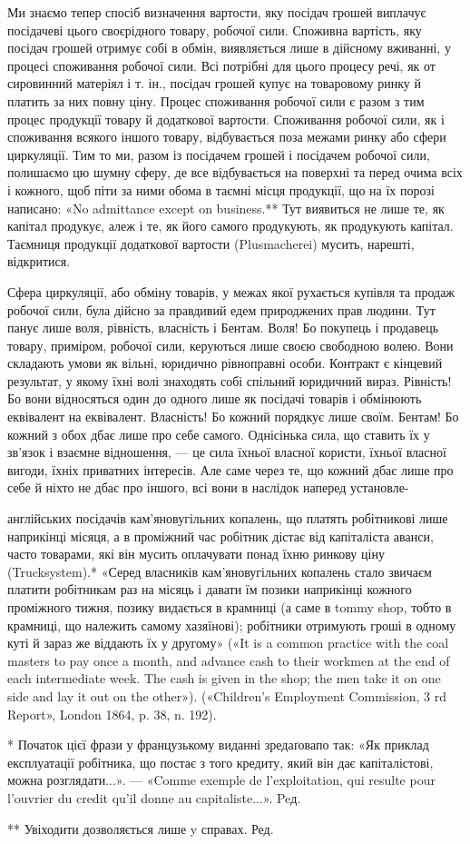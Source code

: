 Ми знаємо тепер спосіб визначення вартости, яку посідач
грошей виплачує посідачеві цього своєрідного товару, робочої
сили. Споживна вартість, яку посідач грошей отримує собі в
обмін, виявляється лише в дійсному вживанні, у процесі споживання
робочої сили. Всі потрібні для цього процесу речі, як от
сировинний матеріял і т. ін., посідач грошей купує на товаровому
ринку й платить за них повну ціну. Процес споживання
робочої сили є разом з тим процес продукції товару й додаткової
вартости. Споживання робочої сили, як і споживання всякого
іншого товару, відбувається поза межами ринку або сфери циркуляції.
Тим то ми, разом із посідачем грошей і посідачем робочої
сили, полишаємо цю шумну сферу, де все відбувається на поверхні
та перед очима всіх і кожного, щоб піти за ними обома в таємні
місця продукції, що на їх порозі написано: «No admittance except
on business.** Тут виявиться не лише те, як капітал продукує,
алеж і те, як його самого продукують, як продукують капітал.
Таємниця продукції додаткової вартости (Plusmacherei) мусить,
нарешті, відкритися.

Сфера циркуляції, або обміну товарів, у межах якої рухається
купівля та продаж робочої сили, була дійсно за правдивий
едем природжених прав людини. Тут панує лише воля, рівність,
власність і Бентам. Воля! Бо покупець і продавець товару, приміром,
робочої сили, керуються лише своєю свободною волею.
Вони складають умови як вільні, юридично рівноправні особи.
Контракт є кінцевий результат, у якому їхні волі знаходять собі
спільний юридичний вираз. Рівність! Бо вони відносяться один
до одного лише як посідачі товарів і обмінюють еквівалент на
еквівалент. Власність! Бо кожний порядкує лише своїм. Бентам!
Бо кожний з обох дбає лише про себе самого. Однісінька
сила, що ставить їх у зв’язок і взаємне відношення, — це сила
їхньої власної користи, їхньої власної вигоди, їхніх приватних
інтересів. Але саме через те, що кожний дбає лише про себе й
ніхто не дбає про іншого, всі вони в наслідок наперед установле-

англійських посідачів кам’яновугільних копалень, що платять робітникові
лише наприкінці місяця, а в проміжний час робітник дістає від капіталіста
аванси, часто товарами, які він мусить оплачувати понад їхню
ринкову ціну (Trucksystem).* «Серед власників кам’яновугільних копалень
стало звичаєм платити робітникам раз на місяць і давати їм позики
наприкінці кожного проміжного тижня, позику видається в крамниці
(а саме в tommy shop, тобто в крамниці, що належить самому хазяїнові);
робітники отримують гроші в одному куті й зараз же віддають їх у другому»
(«It is a common practice with the coal masters to pay once a month,
and advance cash to their workmen at the end of each intermediate week.
The cash is given in the shop; the men take it on one side and lay it out on
the other»). («Children’s Employment Commission, 3 rd Report», London
1864, p. 38, n. 192).

* Початок цієї фрази у французькому виданні зредаґовапо так: «Як
приклад експлуатації робітника, що постає з того кредиту, який він дає
капіталістові, можна розглядати...». — «Comme exemple de l’exploitation,
qui resulte pour l’ouvrier du credit qu’il donne au capitaliste...». Peд.

** Увіходити дозволяється лише y справах. Ред.
